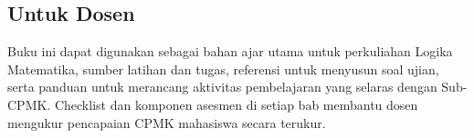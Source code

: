 \subsection{Untuk Dosen}

Buku ini dapat digunakan sebagai bahan ajar utama untuk perkuliahan Logika Matematika, sumber latihan dan tugas, referensi untuk menyusun soal ujian, serta panduan untuk merancang aktivitas pembelajaran yang selaras dengan Sub-CPMK. Checklist dan komponen asesmen di setiap bab membantu dosen mengukur pencapaian CPMK mahasiswa secara terukur.
